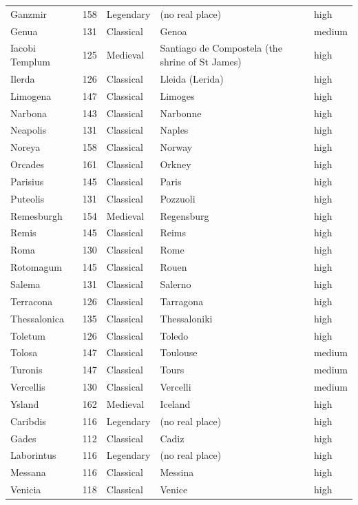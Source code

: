 \documentclass[11pt,a4paper]{article}
\begin{document}
{\begin{longtable}{p{3.2cm}rlp{6.6cm}l}
Ganzmir & 158 & Legendary & (no real place) & high\\
Genua & 131 & Classical & Genoa & medium\\
Iacobi Templum & 125 & Medieval & Santiago de Compostela (the shrine of St James) & high\\
Ilerda & 126 & Classical & Lleida (Lerida) & high\\
Limogena & 147 & Classical & Limoges & high\\
Narbona & 143 & Classical & Narbonne & high\\
Neapolis & 131 & Classical & Naples & high\\
Noreya & 158 & Classical & Norway & high\\
Orcades & 161 & Classical & Orkney & high\\
Parisius & 145 & Classical & Paris & high\\
Puteolis & 131 & Classical & Pozzuoli & high\\
Remesburgh & 154 & Medieval & Regensburg & high\\
Remis & 145 & Classical & Reims & high\\
Roma & 130 & Classical & Rome & high\\
Rotomagum & 145 & Classical & Rouen & high\\
Salema & 131 & Classical & Salerno & high\\
Terracona & 126 & Classical & Tarragona & high\\
Thessalonica & 135 & Classical & Thessaloniki & high\\
Toletum & 126 & Classical & Toledo & high\\
Tolosa & 147 & Classical & Toulouse & medium\\
Turonis & 147 & Classical & Tours & medium\\
Vercellis & 130 & Classical & Vercelli & medium\\
Ysland & 162 & Medieval & Iceland & high\\
Caribdis & 116 & Legendary & (no real place) & high\\
Gades & 112 & Classical & Cadiz & high\\
Laborintus & 116 & Legendary & (no real place) & high\\
Messana & 116 & Classical & Messina & high\\
Venicia & 118 & Classical & Venice & high\\
\bottomrule\end{longtable}}
\end{document}
